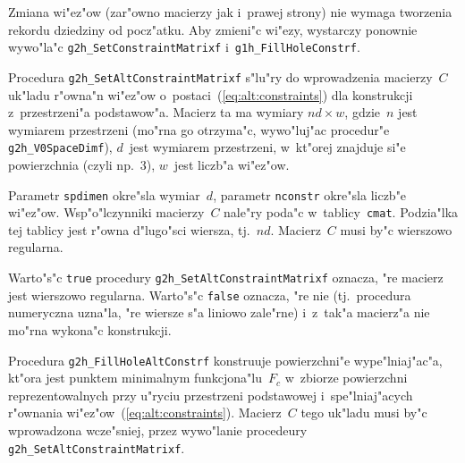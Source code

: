 Zmiana wi"ez"ow (zar"owno macierzy jak i~prawej strony) nie wymaga tworzenia
rekordu dziedziny od pocz"atku. Aby zmieni"c wi"ezy, wystarczy ponownie
wywo"la"c \texttt{g2h\_SetConstraintMatrixf} i~\texttt{g1h\_FillHoleConstrf}.

\vspace{\bigskipamount}
\begin{sloppypar}
Procedura \texttt{g2h\_SetAltConstraintMatrixf} s"lu"ry do wprowadzenia
macierzy~$C$ uk"ladu r"owna"n wi"ez"ow o~postaci~(\ref{eq:alt:constraints})
dla konstrukcji z~przestrzeni"a podstawow"a. Macierz ta ma wymiary $nd\times w$,
gdzie~$n$ jest wymiarem przestrzeni (mo"rna go otrzyma"c, wywo"luj"ac procedur"e
\texttt{g2h\_V0SpaceDimf}), $d$~jest wymiarem przestrzeni, w~kt"orej znajduje
si"e powierzchnia (czyli np.~$3$), $w$~jest liczb"a wi"ez"ow.%
\end{sloppypar}

Parametr \texttt{spdimen} okre"sla wymiar~$d$, parametr \texttt{nconstr}
okre"sla liczb"e wi"ez"ow. Wsp"o"lczynniki macierzy~$C$ nale"ry poda"c
w~tablicy~\texttt{cmat}. Podzia"lka tej tablicy jest r"owna d"lugo"sci
wiersza, tj.~$nd$. Macierz~$C$ musi by"c wierszowo regularna.

Warto"s"c \texttt{true} procedury \texttt{g2h\_SetAltConstraintMatrixf} oznacza,
"re macierz jest wierszowo regularna. Warto"s"c \texttt{false} oznacza, "re nie
(tj.\ procedura numeryczna uzna"la, "re wiersze s"a liniowo zale"rne)
i~z~tak"a macierz"a nie mo"rna wykona"c konstrukcji.

\vspace{\bigskipamount}
\begin{sloppypar}
Procedura \texttt{g2h\_FillHoleAltConstrf} konstruuje powierzchni"e
wype"lniaj"ac"a, kt"ora jest punktem minimalnym funkcjona"lu~$F_c$ w~zbiorze
powierzchni reprezentowalnych przy u"ryciu przestrzeni podstawowej
i~spe"lniaj"acych r"ownania wi"ez"ow~(\ref{eq:alt:constraints}).
Macierz~$C$ tego uk"ladu musi by"c wprowadzona wcze"sniej, przez wywo"lanie
procedeury \texttt{g2h\_SetAltConstraintMatrixf}.%
\end{sloppypar}


